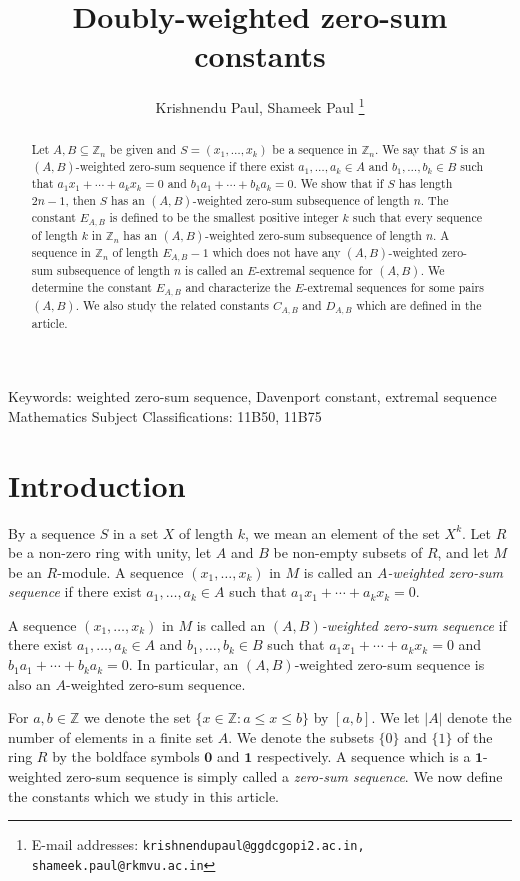 \documentclass{article}[11pt]
\author{Krishnendu Paul, Shameek Paul%
\thanks{E-mail addresses: \texttt{krishnendupaul@ggdcgopi2.ac.in, shameek.paul@rkmvu.ac.in}}}
\affil{\small
Government General Degree College Gopiballavpur-II,
P.O. Beliaberah, Dist. Jhargram, 721517, India \\

\bigskip
Ramakrishna Mission Vivekananda Educational and Research Institute, P.O. Belur Math, Dist. Howrah, 711202, India}
\date{}
\title {Doubly-weighted zero-sum constants}
\theoremstyle{definition}
\begin{document}
\baselineskip=14.5pt


\maketitle


\begin{abstract}
Let $A,B\subseteq\mathbb Z_n$ be given and $S=(x_1,\ldots, x_k)$ be a sequence in $\mathbb Z_n$. We say that $S$ is an $(A,B)$-weighted zero-sum sequence if there exist $a_1,\ldots,a_k\in A$ and $b_1,\ldots,b_k\in B$ such that $a_1x_1+\cdots+a_kx_k=0$ and $b_1a_1+\cdots+b_ka_k=0$. We show that if $S$ has length $2n-1$, then $S$ has an $(A,B)$-weighted zero-sum subsequence of length $n$. The constant $E_{A,B}$ is defined to be the smallest positive integer $k$ such that every sequence of length $k$ in $\mathbb Z_n$ has an $(A,B)$-weighted zero-sum subsequence of length $n$. A sequence in $\mathbb Z_n$ of length $E_{A,B}-1$ which does not have any $(A,B)$-weighted zero-sum subsequence of length $n$ is called an $E$-extremal sequence for $(A,B)$. We determine the constant $E_{A,B}$ and characterize the $E$-extremal sequences for some pairs $(A,B)$. We also study the related constants $C_{A,B}$ and $D_{A,B}$ which are defined in the article.
\end{abstract}

{\small \noindent
Keywords: weighted zero-sum sequence, Davenport constant, extremal sequence \\
Mathematics Subject Classifications: 11B50, 11B75}

\section{Introduction}

By a sequence $S$ in a set $X$ of length $k$, we mean an element of the set $X^k$. Let $R$ be a non-zero ring with unity, let $A$ and $B$ be non-empty subsets of $R$, and let $M$ be an $R$-module. A sequence $(x_1,\ldots, x_k)$ in $M$ is called an {\it $A$-weighted zero-sum sequence} if there exist $a_1,\ldots,a_k\in A$ such that $a_1x_1+\cdots+a_kx_k=0$.

A sequence $(x_1,\ldots,x_k)$ in $M$ is called an {\it $(A,B)$-weighted zero-sum sequence} if there exist $a_1,\ldots,a_k\in A$ and $b_1,\ldots,b_k\in B$ such that $a_1x_1+\cdots+a_kx_k=0$ and $b_1a_1+\cdots +b_ka_k=0$. In particular, an $(A,B)$-weighted zero-sum sequence is also an $A$-weighted zero-sum sequence.

For $a,b\in\mathbb Z$ we denote the set $\{x\in\mathbb Z:a\leq x\leq b\}$ by $[a,b]$. We let $|A|$ denote the number of elements in a finite set $A$. We denote the subsets $\{0\}$ and $\{1\}$ of the ring $R$ by the boldface symbols $\mathbf 0$ and $\mathbf 1$ respectively. A sequence which is a $\mathbf 1$-weighted zero-sum sequence is simply called a {\it zero-sum sequence}. We now define the constants which we study in this article.
\end{document}
